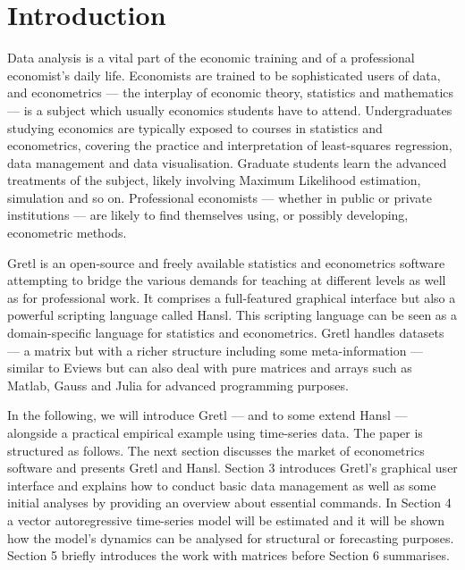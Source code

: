 \documentclass[11pt]{article}
\begin{document}
\section{Introduction}
\label{sec:intro}
Data analysis is a vital part of the economic training and of a professional economist's daily life. Economists are trained to be sophisticated users of data, and econometrics --- the interplay of economic theory, statistics and mathematics --- is a subject which usually economics students have to attend. %
Undergraduates studying economics are typically exposed to courses in statistics and econometrics, covering the practice and interpretation of least-squares regression, data management and data visualisation. Graduate students learn the advanced treatments of the subject, likely involving Maximum Likelihood estimation, simulation and so on. Professional economists --- whether in public or private institutions --- are likely to find themselves using, or possibly developing, econometric methods.

Gretl is an open-source and freely available statistics and econometrics software attempting to bridge the various demands for teaching at different levels as well as for professional work. It comprises a full-featured graphical interface but also a powerful scripting language called Hansl. This scripting language can be seen as a domain-specific language for statistics and econometrics. Gretl handles datasets --- a matrix but with a richer structure including some meta-information %
--- similar to Eviews but can also deal with pure matrices and arrays such as Matlab, Gauss and Julia for advanced programming purposes.

In the following, we will introduce Gretl --- and to some extend Hansl --- alongside a practical empirical example using time-series data. %
The paper is structured as follows. The next section discusses the market of econometrics software and presents Gretl and Hansl. Section 3 introduces Gretl's graphical user interface and explains how to conduct basic data management as well as some initial analyses by providing an overview about essential commands. In Section 4 a vector autoregressive time-series model will be estimated and it will be shown how the model's dynamics can be analysed for structural or forecasting purposes. Section 5 briefly introduces the work with matrices before Section 6 summarises.
\end{document}
